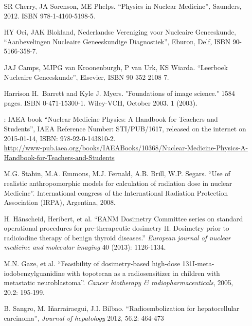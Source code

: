 \begin{thebibliography}{99}

 SR Cherry, JA Sorenson, ME Phelps. ``Physics in
  Nuclear Medicine'', Saunders, 2012. ISBN 978-1-4160-5198-5.


 HY Oei, JAK Blokland, Nederlandse Vereniging voor
  Nucleaire Geneeskunde, ``Aanbevelingen Nucleaire Geneeskundige Diagnostiek'',
  Eburon, Delf, ISBN 90-5166-358-7.

 JAJ Camps, MJPG van Kroonenburgh, P van Urk, KS
  Wiarda. ``Leerboek Nucleaire Geneeskunde'', Elsevier, ISBN 90 352
  2108 7.

 Harrison H.\ Barrett and Kyle J. Myers. "Foundations
  of image science." 1584 pages. ISBN 0-471-15300-1. Wiley-VCH,
  October 2003. 1 (2003).

 : IAEA book ``Nuclear Medicine Physics: A Handbook for
  Teachers and Students'', IAEA Reference Number: STI/PUB/1617,
  released on the internet on 2015-01-14, ISBN: 978-92-0-143810-2.\\
  \href{http://www-pub.iaea.org/books/IAEABooks/10368/Nuclear-Medicine-Physics-A-Handbook-for-Teachers-and-Students}
  {http://www-pub.iaea.org/books/IAEABooks/10368/Nuclear-Medicine-Physics-A-Handbook-for-Teachers-and-Students}

 M.G. Stabin, M.A. Emmons, M.J. Fernald,
  A.B. Brill, W.P. Segars. ``Use of realistic anthropomorphic models
  for calculation of radiation dose in nuclear Medicine''.
  International congress of the International Radiation Protection
  Association (IRPA), Argentina, 2008.
  
 H. H\"anscheid, Heribert, et al. ``EANM Dosimetry
  Committee series on standard operational procedures for
  pre-therapeutic dosimetry II. Dosimetry prior to radioiodine therapy
  of benign thyroid diseases.'' {\em European journal of nuclear medicine
  and molecular imaging} 40 (2013): 1126-1134.
  
 M.N. Gaze, et al. ``Feasibility of dosimetry-based
  high-dose 131I-meta-iodobenzylguanidine with topotecan as a
  radiosensitizer in children with metastatic neuroblastoma''.
  {\em Cancer biotherapy \& radiopharmaceuticals}, 2005, 20.2: 195-199.

 B. Sangro, M. I\~narrairaegui, J.I. Bilbao.
  ``Radioembolization for hepatocellular carcinoma'',
  {\em Journal of hepatology} 2012, 56.2: 464-473


\end{thebibliography}
